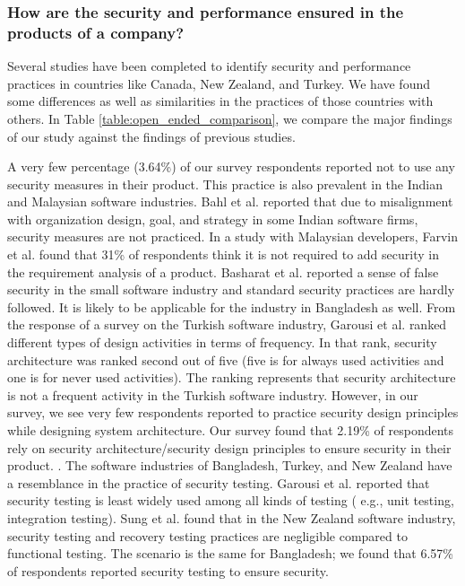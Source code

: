 \subsubsection{How are the security and performance ensured in the products of a company?}

Several studies have been completed to identify security and performance practices in countries like Canada, New Zealand, and Turkey. We have found some differences as well as similarities in the practices of those countries with others.  In Table \ref{table:open_ended_comparison}, we compare the major findings of our study against the findings of previous studies.


\label{security_comparison}
A very few percentage (3.64\%) of our survey respondents reported not to use any security measures in their product. This practice is also prevalent in the Indian and Malaysian software industries. Bahl et al.\cite{Bahl2011} reported that due to misalignment with organization design, goal, and strategy in some Indian software firms, security measures are not practiced. In a study with Malaysian developers, Farvin et al.\cite{Farvin2016} found that 31\% of respondents think it is not required to add security in the requirement analysis of a product. Basharat et al.\cite{Basharat2013} reported a sense of false security in the small software industry and standard security practices are hardly followed. It is likely to be applicable for the industry in Bangladesh as well. From the response of a survey on the Turkish software industry, Garousi et al.\cite{Garousi2015} ranked different types of design activities in terms of frequency. In that rank, security architecture was ranked second out of five (five is for always used activities and one is for never used activities). The ranking represents that security architecture is not a frequent activity in the Turkish software industry. However, in our survey, we see very few respondents reported to practice security design principles while designing system architecture. Our survey found that 2.19\% of respondents rely on security architecture/security design principles to ensure security in their product. . The software industries of Bangladesh, Turkey, and New Zealand  have a resemblance in the practice of security testing. Garousi et al.\cite{Garousi2015} reported that security testing is least widely used among all kinds of testing ( e.g., unit testing, integration testing). Sung et al.\cite{Sung2006} found that in the New Zealand software industry, security testing and recovery testing practices are negligible compared to functional testing. The scenario is the same for Bangladesh; we found that 6.57\% of respondents reported security testing to ensure security.


